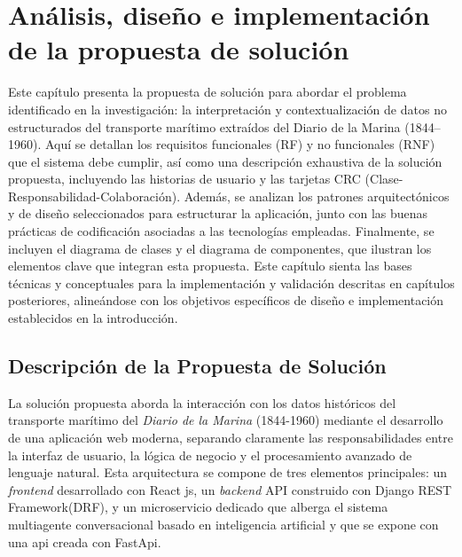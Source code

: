 \chapter{Análisis, diseño e implementación de la propuesta de solución}
\label{chap:chapter2}

Este capítulo presenta la propuesta de solución para abordar el problema identificado en la investigación: la interpretación y contextualización de datos no estructurados del transporte marítimo extraídos del Diario de la Marina (1844–1960). Aquí se detallan los requisitos funcionales (RF) y no funcionales (RNF) que el sistema debe cumplir, así como una descripción exhaustiva de la solución propuesta, incluyendo las historias de usuario y las tarjetas CRC (Clase-Responsabilidad-Colaboración). Además, se analizan los patrones arquitectónicos y de diseño seleccionados para estructurar la aplicación, junto con las buenas prácticas de codificación asociadas a las tecnologías empleadas. Finalmente, se incluyen el diagrama de clases y el diagrama de componentes, que ilustran los elementos clave que integran esta propuesta. Este capítulo sienta las bases técnicas y conceptuales para la implementación y validación descritas en capítulos posteriores, alineándose con los objetivos específicos de diseño e implementación establecidos en la introducción.

\section{Descripción de la Propuesta de Solución}
\label{sec:propuesta_solucion}

La solución propuesta aborda la interacción con los datos históricos del transporte marítimo del \textit{Diario de la Marina} (1844-1960) mediante el desarrollo de una aplicación web moderna, separando claramente las responsabilidades entre la interfaz de usuario, la lógica de negocio y el procesamiento avanzado de lenguaje natural. Esta arquitectura se compone de tres elementos principales: un \textit{frontend} desarrollado con React js, un \textit{backend} API construido con Django REST Framework(DRF), y un microservicio dedicado que alberga el sistema multiagente conversacional basado en inteligencia artificial y que se expone con una api creada con FastApi. 

